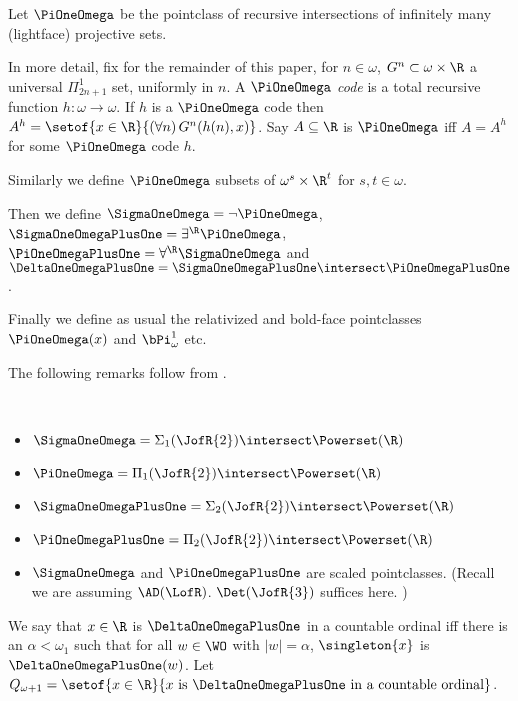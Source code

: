 \documentclass[oneside,12pt]{amsart}
\begin{document}
\begin{definition}
Let $\PiOneOmega$ be the pointclass of recursive intersections of infinitely many (lightface) projective sets.

In more detail, fix for the remainder of this paper, for $n\in\omega$, $G^n\subset\omega\times\R$
a universal $\Pi^1_{2n+1}$ set, uniformly in $n$.
A $\PiOneOmega$ \emph{code} is a total recursive function $h:\omega\to\omega$. If $h$ is a $\PiOneOmega$ code then
$A^h=\setof{x\in\R}{(\forall n)\, G^n(h(n),x)}$. Say $A\subseteq\R$ is $\PiOneOmega$ iff
$A=A^h$ for some $\PiOneOmega$ code $h$.

Similarly we define $\PiOneOmega$ subsets of $\omega^s\times \R^t$ for $s,t\in\omega$.

Then we define $\SigmaOneOmega = \neg\PiOneOmega$, $\SigmaOneOmegaPlusOne=\exists^{\R}\PiOneOmega$,
$\PiOneOmegaPlusOne = \forall^{\R}\SigmaOneOmega$ and
$\DeltaOneOmegaPlusOne = \SigmaOneOmegaPlusOne \intersect \PiOneOmegaPlusOne$.

Finally we define as usual the relativized and bold-face
pointclasses $\PiOneOmega(x)$
and $\bPi^1_{\omega}$ etc.
\end{definition}

The following remarks follow from \cite{Scales_In_LofR}.
\begin{remarks} \
\begin{itemize}
\item $\SigmaOneOmega = \Sigma_1(\JofR{2}) \intersect \Powerset(\R)$
\item $\PiOneOmega = \Pi_1(\JofR{2}) \intersect \Powerset(\R)$
\item $\SigmaOneOmegaPlusOne = \Sigma_2(\JofR{2}) \intersect \Powerset(\R)$
\item $\PiOneOmegaPlusOne = \Pi_2(\JofR{2}) \intersect \Powerset(\R)$
\item $\SigmaOneOmega$ and $\PiOneOmegaPlusOne$
are scaled pointclasses.
(Recall we are assuming $\AD(\LofR)$. $\Det(\JofR{3})$ suffices here. )
\end{itemize}
\end{remarks}


\begin{definition}
We say that $x\in\R$ is $\DeltaOneOmegaPlusOne$ in a countable ordinal iff there is an $\alpha<\omega_1$ such
that for all $w\in\WO$ with $|w|=\alpha$, $\singleton{x}$ is $\DeltaOneOmegaPlusOne(w)$.
Let $Q_{\omega+1} = \setof{x\in\R}{x\text{ is }\DeltaOneOmegaPlusOne\text{ in a countable ordinal}}$.
\end{definition}
\end{document}
